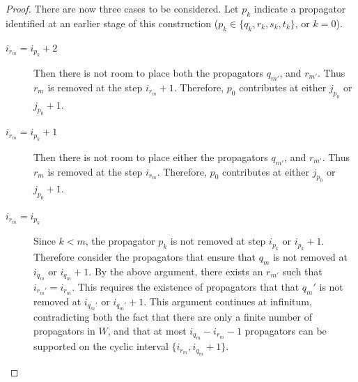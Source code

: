 \documentclass[11pt]{article}
\newcommand{\drawWLD}[2]{

\pgfmathsetmacro{\n}{#1}
\pgfmathsetmacro{\radius}{#2}
\pgfmathsetmacro{\angle}{360/\n}
    \foreach \i in {1,2,...,\n} {
      \pgfmathsetmacro{\x}{\angle*\i}
        \draw[-,shorten >=-\radius*0.1 cm,shorten <=-\radius*0.1 cm]  (\x:\radius cm)-- (\x + \angle: \radius cm);
    }

\draw (\angle:\radius) node {$\bullet$};
}
\newcommand{\drawprop}[4]{
\pgfmathsetmacro{\r}{#1}
\pgfmathsetmacro{\bumpr}{#2}
\pgfmathsetmacro{\s}{#3}
\pgfmathsetmacro{\bumps}{#4}
\pgfmathsetmacro{\perturbe}{\angle/\n}

\begin{scope}
\clip (\angle*\r:\radius) -- (\angle + \angle*\r:\radius) -- (\angle*\s:\radius) -- (\angle + \angle*\s:\radius) -- (\angle*\r:\radius);
\draw[propagator] (\angle*\r + \angle/2 + \bumpr*\perturbe:\radius) -- (\angle*\s + \angle/2 + \bumps*\perturbe:\radius);
\end{scope}
}
\theoremstyle{remark}
\theoremstyle{definition}
\begin{document}
\begin{proof}
There are now three cases to be considered. Let $p_k$ indicate a propagator identified at an earlier stage of this construction ($p_k \in \{q_k, r_k, s_k, t_k\}$, or $k=0$).

 \begin{description}
\item[$i_{r_m} = i_{p_k}+2$] Then there is not room to place both the propagators $q_{m'}$, and $r_{m'}$. Thus $r_m$ is removed at the step $i_{r_m} + 1$. Therefore, $p_0$ contributes at either $j_{p_0}$ or $j_{p_0}+1$.
 \item[$i_{r_m} = i_{p_k}+1$] Then there is not room to place either the propagators $q_{m'}$, and $r_{m'}$. Thus $r_m$ is removed at the step $i_{r_m}$. Therefore, $p_0$ contributes at either $j_{p_0}$ or $j_{p_0}+1$.
 \item[$i_{r_m} = i_{p_k}$] Since $k < m$, the propagator $p_k$ is not removed at step $i_{p_k}$ or $i_{p_k}+1$. Therefore consider the propagators that ensure that $q_m$ is not removed at $i_{q_m}$ or $i_{q_m}+1$. By the above argument, there exists an $r_{m'}$ such that $i_{r_m'} = i_{r_m}$. This requires the existence of propagators that that $q_m'$ is not removed at $i_{q_m'}$ or $i_{q_m'}+1$. This argument continues at infinitum, contradicting both the fact that there are only a finite number of propagators in $W$, and that at most $i_{q_m} - i_{r_m}-1$ propagators can be supported on the cyclic interval $\{i_{r_m}, i_{q_m}+1\}$.
 \end{description}

\end{proof}
\end{document}

